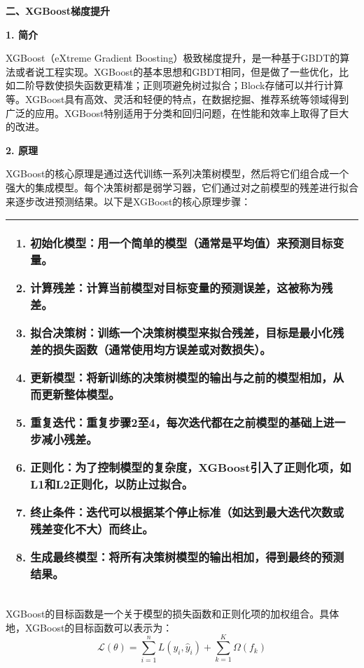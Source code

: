 \documentclass[bwprint]{gmcmthesis}
\begin{document}
				\textbf{二、XGBoost梯度提升}
				
				\textbf{1. 简介}
				
				XGBoost（eXtreme Gradient Boosting）极致梯度提升，是一种基于GBDT的算法或者说工程实现。XGBoost的基本思想和GBDT相同，但是做了一些优化，比如二阶导数使损失函数更精准；正则项避免树过拟合；Block存储可以并行计算等。XGBoost具有高效、灵活和轻便的特点，在数据挖掘、推荐系统等领域得到广泛的应用。XGBoost特别适用于分类和回归问题，在性能和效率上取得了巨大的改进。
				
				\textbf{2. 原理}
				
				XGBoost的核心原理是通过迭代训练一系列决策树模型，然后将它们组合成一个强大的集成模型。每个决策树都是弱学习器，它们通过对之前模型的残差进行拟合来逐步改进预测结果。以下是XGBoost的核心原理步骤：
				
				\begin{table}[H]
					\centering
					\begin{tabularx}{\textwidth}{|X|}
						\hline
						\begin{enumerate}
							\item \textbf{初始化模型}：用一个简单的模型（通常是平均值）来预测目标变量。
							\item \textbf{计算残差}：计算当前模型对目标变量的预测误差，这被称为残差。
							\item \textbf{拟合决策树}：训练一个决策树模型来拟合残差，目标是最小化残差的损失函数（通常使用均方误差或对数损失）。
							\item \textbf{更新模型}：将新训练的决策树模型的输出与之前的模型相加，从而更新整体模型。
							\item \textbf{重复迭代}：重复步骤2至4，每次迭代都在之前模型的基础上进一步减小残差。
							\item \textbf{正则化}：为了控制模型的复杂度，XGBoost引入了正则化项，如L1和L2正则化，以防止过拟合。
							\item \textbf{终止条件}：迭代可以根据某个停止标准（如达到最大迭代次数或残差变化不大）而终止。
							\item \textbf{生成最终模型}：将所有决策树模型的输出相加，得到最终的预测结果。
						\end{enumerate}\\
						\hline
					\end{tabularx}
				\end{table}
				
				
				
				XGBoost的目标函数是一个关于模型的损失函数和正则化项的加权组合。具体地，XGBoost的目标函数可以表示为：
				\[
				\mathcal{L}(\theta) = \sum_{i=1}^{n} L(y_i, \hat{y}_i) + \sum_{k=1}^{K} \Omega(f_k)
				\]
				
\end{document}
